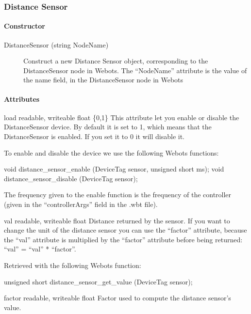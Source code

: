 \subsubsection{Distance Sensor}

\paragraph{Constructor}

\noindent
\begin{description}
\item[{DistanceSensor (string NodeName)}] Construct a new Distance
  Sensor object, corresponding to the DistanceSensor node in
  Webots. The ``NodeName'' attribute is the value of the name field,
  in the DistanceSensor node in Webots
\end{description}

\paragraph{Attributes}

\begin{itemize}
\begin{attribute}{load}
  {readable, writeable}
  {float}
  {\{0,1\}}
  This attribute let you enable or disable the
  DistanceSensor device.  By default it is set to 1, which means that
  the DistanceSensor is enabled. If you set it to 0 it will disable
  it.

  To enable and disable the device we use the following Webots
  functions:
\begin{cxx}
void distance_sensor_enable (DeviceTag sensor, unsigned short ms);
void distance_sensor_disable (DeviceTag sensor);
\end{cxx}

The frequency given to the enable function is the frequency of the
\urbi controller (given in the ``controllerArgs'' field in the .wbt
file).
\end{attribute}

\begin{attribute}{val}
  {readable, writeable}
  {float}
  {}
  Distance returned by the sensor. If you want to change
 the unit of the distance sensor you can use the ``factor'' attribute,
 because the ``val'' attribute is multiplied by the ``factor'' attribute
 before being returned: ``val'' = ``val'' * ``factor''.

 Retrieved with the following Webots function:

\begin{cxx}
unsigned short distance_sensor_get_value  (DeviceTag sensor);
\end{cxx}
\end{attribute}

\begin{attribute}{factor}
  {readable, writeable}
  {float}
  {}
  Factor used to compute the distance sensor's value.
\end{attribute}
\end{itemize}

